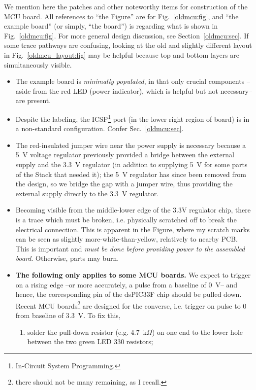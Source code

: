 \documentclass[letterpaper]{article}
\begin{document}
We mention here the patches and other noteworthy items for
construction of the MCU board. All references to ``the Figure'' are
for Fig.~\ref{oldmcu:fig}, and ``the example board'' (or simply, ``the
board'') is regarding what is shown in Fig.~\ref{oldmcu:fig}. For more
general design discussion, see Section~\ref{oldmcu:sec}. If some trace
pathways are confusing, looking at the old and slightly different
layout in Fig.~\ref{oldmcu_layout:fig} may be helpful because top and
bottom layers are simultaneously visible.
\begin{itemize}
\item The example board is \textit{minimally populated}, in that only
  crucial components --aside from the red LED (power indicator),
  which is helpful but not necessary-- are present.

\item Despite the labeling, the ICSP\footnote{In-Circuit System
  Programming.} port (in the lower right region of board) is in a
  non-standard configuration. Confer Sec.~\ref{oldmcu:sec}.

\item The red-insulated jumper wire near the power supply is necessary
  because a 5~V voltage regulator previously provided a bridge between
  the external supply and the 3.3~V regulator (in addition to
  supplying 5~V for some parts of the Stack that needed it); the 5~V
  regulator has since been removed from the design, so we bridge the
  gap with a jumper wire, thus providing the external supply directly
  to the 3.3~V regulator.

\item Becoming visible from the middle-lower edge of the 3.3V
  regulator chip, there is a trace which must be broken,
  i.e. physically scratched off to break the electrical
  connection. This is apparent in the Figure, where my scratch marks
  can be seen as slightly more-white-than-yellow, relatively to nearby
  PCB. This is important and \textit{must be done before providing
    power to the assembled board}. Otherwise, parts may burn.

\item \textbf{The following only applies to some MCU boards.} We
  expect to trigger on a rising edge --or more accurately, a pulse
  from a baseline of 0~V-- and hence, the corresponding pin of the
  dsPIC33F chip should be pulled down. Recent MCU
  boards\footnote{there should not be many remaining, as I recall.}
  are designed for the converse, i.e. trigger on pulse to 0 from
  baseline of 3.3~V. To fix this,
  \begin{enumerate}
    \item solder the pull-down resistor (e.g. 4.7~k$\Omega$) on one end
      to the lower hole between the two green LED 330 resistors;


\end{enumerate}
\end{itemize}
\end{document}
